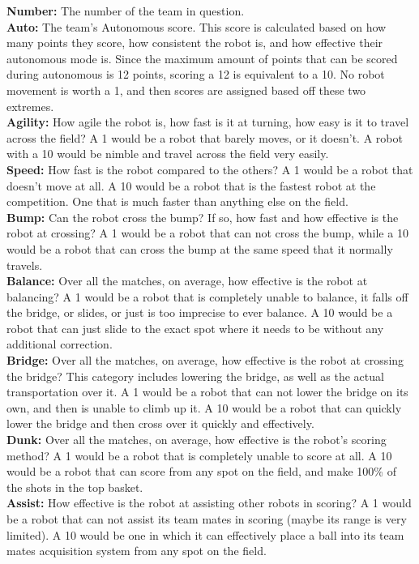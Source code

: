 \documentclass[landscape, 10pt]{report}
\begin{document}
\textbf{Number: }The number of the team in question.\\ 
\textbf{Auto: }The team's Autonomous score. This score is calculated based on how many points they score, how consistent the robot is, and how effective their autonomous mode is. Since the maximum amount of points that can be scored during autonomous is 12 points, scoring a 12 is equivalent to a 10. No robot movement is worth a 1, and then scores are assigned based off these two extremes.\\ 
\textbf{Agility: }How agile the robot is, how fast is it at turning, how easy is it to travel across the field? A 1 would be a robot that barely moves, or it doesn't. A robot with a 10 would be nimble and travel across the field very easily. \\ 
\textbf{Speed: }How fast is the robot compared to the others? A 1 would be a robot that doesn't move at all. A 10 would be a robot that is the fastest robot at the competition. One that is much faster than anything else on the field. \\ 
\textbf{Bump: }Can the robot cross the bump? If so, how fast and how effective is the robot at crossing? A 1 would be a robot that can not cross the bump, while a 10 would be a robot that can cross the bump at the same speed that it normally travels. \\ 
\textbf{Balance: }Over all the matches, on average, how effective is the robot at balancing? A 1 would be a robot that is completely unable to balance, it falls off the bridge, or slides, or just is too imprecise to ever balance. A 10 would be a robot that can just slide to the exact spot where it needs to be without any additional correction. \\ 
\textbf{Bridge: }Over all the matches, on average, how effective is the robot at crossing the bridge? This category includes lowering the bridge, as well as the actual transportation over it. A 1 would be a robot that can not lower the bridge on its own, and then is unable to climb up it. A 10 would be a robot that can quickly lower the bridge and then cross over it quickly and effectively. \\ 
\textbf{Dunk: }Over all the matches, on average, how effective is the robot's scoring method? A 1 would be a robot that is completely unable to score at all. A 10 would be a robot that can score from any spot on the field, and make 100\% of the shots in the top basket. \\ 
\textbf{Assist: }How effective is the robot at assisting other robots in scoring? A 1 would be a robot that can not assist its team mates in scoring (maybe its range is very limited). A 10 would be one in which it can effectively place a ball into its team mates acquisition system from any spot on the field. \\ 
\end{document}
